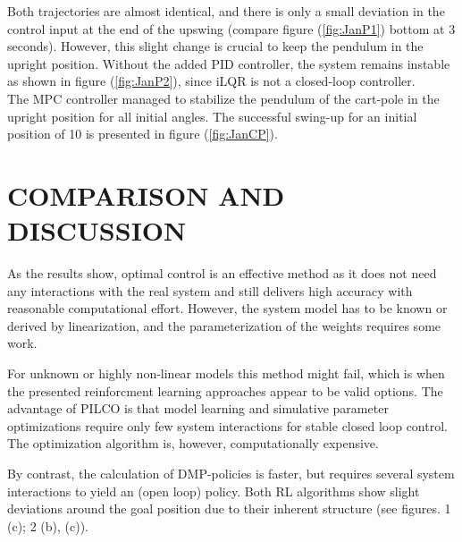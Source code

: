 \documentclass[letterpaper, 10 pt, conference]{ieeeconf}  %
\begin{document}
Both trajectories are almost identical, and there is only a small deviation in the control input at the end of the upswing (compare figure (\ref{fig:JanP1}) bottom at 3 seconds). However, this slight change is crucial to keep the pendulum in the upright position. Without the added PID controller, the system remains instable as shown in figure (\ref{fig:JanP2}), since iLQR is not a closed-loop controller.\\

The MPC controller managed to stabilize the pendulum of the cart-pole in the upright position for all initial angles. The successful swing-up for an initial position of 10 is presented in figure (\ref{fig:JanCP}). 



\section{COMPARISON AND DISCUSSION}
As the results show, optimal control is an effective method as it does not need any interactions with the real system and still delivers high accuracy with reasonable computational effort. However, the system model has to be known or derived by linearization, and the parameterization of the weights requires some work.

For unknown or highly non-linear models this method might fail, which is when the presented reinforcment learning approaches appear to be valid options. The advantage of PILCO is that model learning and simulative parameter optimizations require only few system interactions for stable closed loop control. The optimization algorithm is, however, computationally expensive. 

By contrast, the calculation of DMP-policies  is faster, but requires several system interactions to yield an (open loop) policy. Both RL algorithms show slight deviations around the goal position due to their inherent structure (see figures. 1 (c); 2 (b), (c)).
\end{document}
